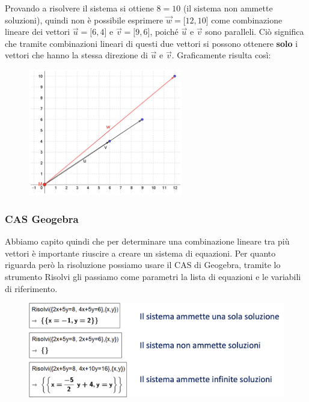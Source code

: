 \documentclass[../main.tex]{subfiles}
\begin{document}
Provando a risolvere il sistema si ottiene $8=10$ (il sistema non ammette soluzioni), quindi non è possibile esprimere $\vec{w}= \lbrack12,10\rbrack$ come combinazione lineare dei vettori $\vec{u}= \lbrack6,4\rbrack$ e $\vec{v}= \lbrack9,6\rbrack$, poiché $\vec{u}$ e $\vec{v}$ sono paralleli. Ciò significa che tramite combinazioni lineari di questi due vettori si possono ottenere \textbf{solo} i vettori che hanno la stessa direzione di $\vec{u}$ e $\vec{v}$. Graficamente risulta così:
\begin{figure}[h]
    \centering
    \includegraphics[width=0.6\textwidth]{../images/vettoriParalleli.png}
\end{figure}

\subsubsection{CAS Geogebra}
Abbiamo capito quindi che per determinare una combinazione lineare tra più vettori è importante riuscire a creare un sistema di equazioni. Per quanto riguarda però la risoluzione possiamo usare il CAS di Geogebra, tramite lo strumento Risolvi gli passiamo come parametri la lista di equazioni e le variabili di riferimento.
\begin{figure}[h]
    \centering
    \includegraphics[width=1\textwidth]{../images/casGeogebra.png}
\end{figure}
\end{document}
